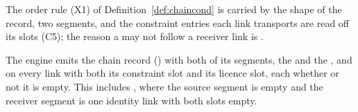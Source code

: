 
The order rule (X1) of Definition~\ref{def:chaincond} is carried by the shape
of the record, two segments, and the constraint entries each link transports
are read off its slots (C5); the reason a  may not follow a
receiver link is .

\begin{requirement}
\label{req:chain-record-slots}
The engine emits the chain record () with both
of its segments, the  and the , and on
every link with both its constraint slot and its licence slot, each whether
or not it is empty. This includes , where the source segment is
empty and the receiver segment is one identity link with both slots empty.
\end{requirement}
